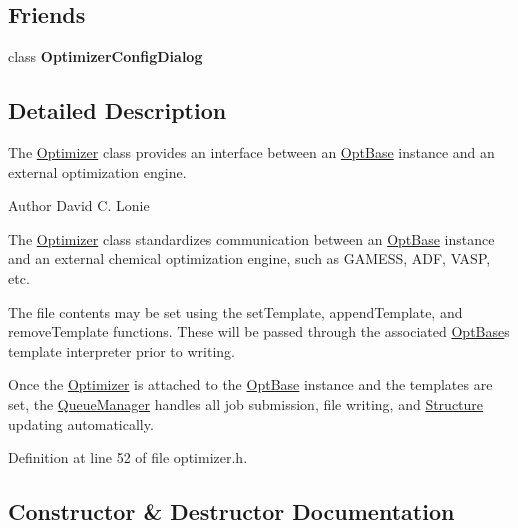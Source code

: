 \subsection*{Friends}
\begin{DoxyCompactItemize}
\item 
\hypertarget{classGlobalSearch_1_1Optimizer_a820134b906cccccfc214c45661db99bf}{}class {\bfseries Optimizer\+Config\+Dialog}\label{classGlobalSearch_1_1Optimizer_a820134b906cccccfc214c45661db99bf}

\end{DoxyCompactItemize}


\subsection{Detailed Description}
The \hyperlink{classGlobalSearch_1_1Optimizer}{Optimizer} class provides an interface between an \hyperlink{classGlobalSearch_1_1OptBase}{Opt\+Base} instance and an external optimization engine. 

\begin{DoxyAuthor}{Author}
David C. Lonie
\end{DoxyAuthor}
The \hyperlink{classGlobalSearch_1_1Optimizer}{Optimizer} class standardizes communication between an \hyperlink{classGlobalSearch_1_1OptBase}{Opt\+Base} instance and an external chemical optimization engine, such as G\+A\+M\+E\+S\+S, A\+D\+F, V\+A\+S\+P, etc.

The file contents may be set using the set\+Template, append\+Template, and remove\+Template functions. These will be passed through the associated \hyperlink{classGlobalSearch_1_1OptBase}{Opt\+Base}\textquotesingle{}s template interpreter prior to writing.

Once the \hyperlink{classGlobalSearch_1_1Optimizer}{Optimizer} is attached to the \hyperlink{classGlobalSearch_1_1OptBase}{Opt\+Base} instance and the templates are set, the \hyperlink{classGlobalSearch_1_1QueueManager}{Queue\+Manager} handles all job submission, file writing, and \hyperlink{classGlobalSearch_1_1Structure}{Structure} updating automatically. 

Definition at line 52 of file optimizer.\+h.



\subsection{Constructor \& Destructor Documentation}
\hypertarget{classGlobalSearch_1_1Optimizer_a8c5a3335ff76f8a6a21a160d0139d842}{}
